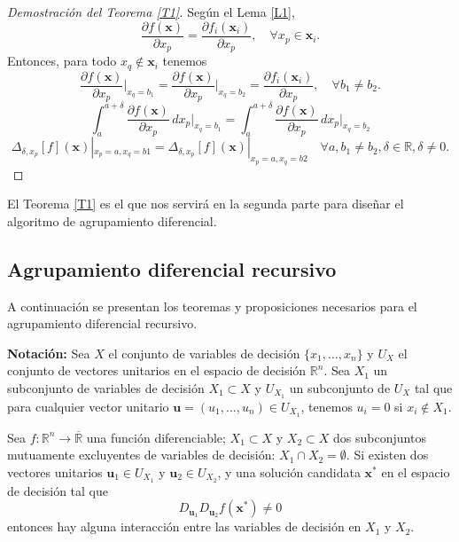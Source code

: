 \begin{proof}[Demostración del Teorema \ref{T1}]
Según el Lema \ref{L1},
\begin{equation}
\frac{\partial f(\mathbf{x})}{\partial x_p} = \frac{\partial f_i(\mathbf{x}_i)}{\partial x_p}, \quad \forall x_p \in \mathbf{x}_i.
\label{EQ12}
\end{equation}
Entonces, para todo \( x_q \notin \mathbf{x}_i \) tenemos
\begin{equation}
\frac{\partial f(\mathbf{x})}{\partial x_p} \bigg|_{x_q=b_1} = \frac{\partial f(\mathbf{x})}{\partial x_p} \bigg|_{x_q=b_2} = \frac{\partial f_i(\mathbf{x}_i)}{\partial x_p}, \quad \forall b_1 \neq b_2.
\label{EQ13}
\end{equation}
\begin{equation}
\int_{a}^{a+\delta} \frac{\partial f(\mathbf{x})}{\partial x_p} \, dx_p \bigg|_{x_q=b_1} = \int_{a}^{a+\delta} \frac{\partial f(\mathbf{x})}{\partial x_p} \, dx_p \bigg|_{x_q=b_2}
\label{EQ14}
\end{equation}
\begin{equation}
\Delta_{\delta,x_p}[f](\mathbf{x})|_{x_p=a, x_q=b1} = \Delta_{\delta,x_p}[f](\mathbf{x})|_{x_p=a, x_q=b2} \quad \forall a, b_1 \neq b_2, \delta \in \mathbb{R}, \delta \neq 0.
\label{EQ15}
\end{equation}
\end{proof}

El Teorema \ref{T1} es el que nos servirá en la segunda parte para diseñar el algoritmo de agrupamiento diferencial. 

\subsection{Agrupamiento diferencial recursivo}

A continuación se presentan los teoremas y proposiciones necesarios para el agrupamiento diferencial recursivo.

\textbf{Notación:} Sea \( X \) el conjunto de variables de decisión \(\{x_1, \ldots, x_n\}\) y \( U_X \) el conjunto de vectores unitarios en el espacio de decisión \(\mathbb{R}^n\). Sea \( X_1 \) un subconjunto de variables de decisión \( X_1 \subset X \) y \( U_{X_1} \) un subconjunto de \( U_X \) tal que para cualquier vector unitario \( \mathbf{u} = (u_1, \ldots, u_n) \in U_{X_1} \), tenemos \( u_i = 0 \) si \( x_i \notin X_1 \).

\begin{proposicion}
\label{P1}
Sea \( f : \mathbb{R}^n \to \overline{\mathbb{R}} \) una función diferenciable; \( X_1 \subset X \) y \( X_2 \subset X \) dos subconjuntos mutuamente excluyentes de variables de decisión: \( X_1 \cap X_2 = \emptyset \). Si existen dos vectores unitarios \( \mathbf{u}_1 \in U_{X_1} \) y \( \mathbf{u}_2 \in U_{X_2} \), y una solución candidata \( \mathbf{x}^* \) en el espacio de decisión tal que
\begin{equation}
D_{\mathbf{u}_1} D_{\mathbf{u}_2} f(\mathbf{x}^*) \neq 0
\label{EQ16}
\end{equation}
entonces hay alguna interacción entre las variables de decisión en \( X_1 \) y \( X_2 \).
\end{proposicion}

